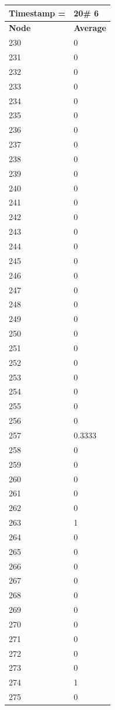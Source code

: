 \begin{tabular}{|l||l|}
\hline
\textbf{Timestamp =} & \textbf{20}\# 6\\\hline
	\textbf{Node} & \textbf{Average} \\ \hline
\hline
	230 & 0 \\ \hline
	231 & 0 \\ \hline
	232 & 0 \\ \hline
	233 & 0 \\ \hline
	234 & 0 \\ \hline
	235 & 0 \\ \hline
	236 & 0 \\ \hline
	237 & 0 \\ \hline
	238 & 0 \\ \hline
	239 & 0 \\ \hline
	240 & 0 \\ \hline
	241 & 0 \\ \hline
	242 & 0 \\ \hline
	243 & 0 \\ \hline
	244 & 0 \\ \hline
	245 & 0 \\ \hline
	246 & 0 \\ \hline
	247 & 0 \\ \hline
	248 & 0 \\ \hline
	249 & 0 \\ \hline
	250 & 0 \\ \hline
	251 & 0 \\ \hline
	252 & 0 \\ \hline
	253 & 0 \\ \hline
	254 & 0 \\ \hline
	255 & 0 \\ \hline
	256 & 0 \\ \hline
	257 & 0.3333 \\ \hline
	258 & 0 \\ \hline
	259 & 0 \\ \hline
	260 & 0 \\ \hline
	261 & 0 \\ \hline
	262 & 0 \\ \hline
	263 & 1 \\ \hline
	264 & 0 \\ \hline
	265 & 0 \\ \hline
	266 & 0 \\ \hline
	267 & 0 \\ \hline
	268 & 0 \\ \hline
	269 & 0 \\ \hline
	270 & 0 \\ \hline
	271 & 0 \\ \hline
	272 & 0 \\ \hline
	273 & 0 \\ \hline
	274 & 1 \\ \hline
	275 & 0 \\ \hline
\end{tabular}

